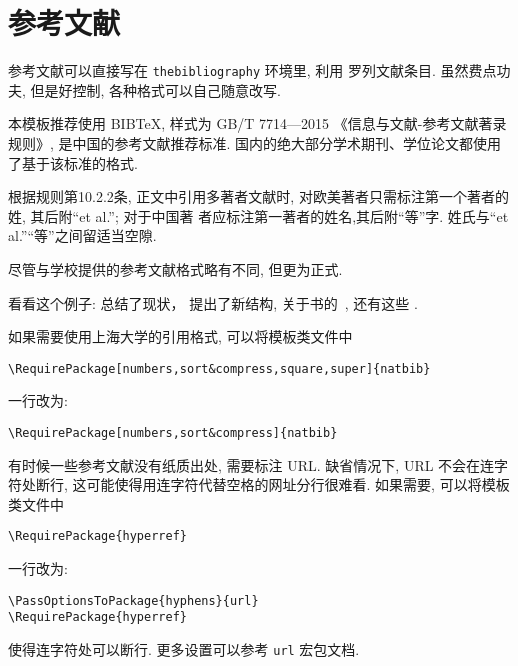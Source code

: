 \chapter{参考文献}
\label{cha:bib}
参考文献可以直接写在 \texttt{thebibliography} 环境里, 利用  罗列文献条目.
虽然费点功夫, 但是好控制, 各种格式可以自己随意改写.

本模板推荐使用 BIB\TeX, 样式为 GB/T 7714—2015 《信息与文献-参考文献著录规则》, 是中国的参考文献推荐标准.
国内的绝大部分学术期刊、学位论文都使用了基于该标准的格式.

根据规则第10.2.2条, 正文中引用多著者文献时, 对欧美著者只需标注第一个著者的姓, 其后附“et al.”; 对于中国著
者应标注第一著者的姓名,其后附“等”字. 姓氏与“et al.”“等”之间留适当空隙.

尽管与学校提供的参考文献格式略有不同, 但更为正式.

看看这个例子: \citet{drl_2018} 总结了现状，\citet{narasimhan_language_2015} 提出了新结构, 
关于书的~\cite{tex1989,algebra2000}, 还有这些 \cite{narasimhan_language_2015,
drl_2018,nikiforov2014,BuFanZhou2016:Z-eigenvalues,HuQiShao2013:Cored-Hypergraphs,
KangNikiforov2014:Extremal-Problems,LinZhou2016:Distance-Spectral,
LuMan2016:Small-Spectral-Radius,Nikiforov2017:Symmetric-Spectrum,Qi2014:H-Plus-Eigenvalues}.

如果需要使用上海大学的引用格式, 可以将模板类文件中
\begin{verbatim}
\RequirePackage[numbers,sort&compress,square,super]{natbib}
\end{verbatim}
一行改为:
\begin{verbatim}
\RequirePackage[numbers,sort&compress]{natbib}
\end{verbatim}

有时候一些参考文献没有纸质出处, 需要标注 URL.
缺省情况下, URL 不会在连字符处断行, 这可能使得用连字符代替空格的网址分行很难看.
如果需要, 可以将模板类文件中
\begin{verbatim}
\RequirePackage{hyperref}
\end{verbatim}
一行改为:
\begin{verbatim}
\PassOptionsToPackage{hyphens}{url}
\RequirePackage{hyperref}
\end{verbatim}
使得连字符处可以断行. 更多设置可以参考 \texttt{url} 宏包文档.